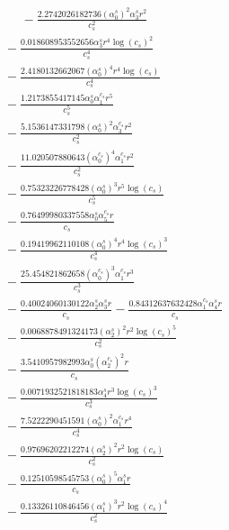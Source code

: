 \documentclass[10pt]{article}
\begin{document}
\begin{align*}
\phantom{R_{0,8}} &\phantom{={}}{}  - \frac{2.2742026182736 \left(\alpha_{0}^s\right)^{2} \alpha_{3}^s r^{2}}{c_{s}^{2}} \\
&{}  - \frac{0.018608953552656 \alpha_{3}^s r^{4} \log{\left(c_{s} \right)}^{2}}{c_{s}^{4}} \\
&{}  - \frac{2.4180132662067 \left(\alpha_{0}^s\right)^{4} r^{4} \log{\left(c_{s} \right)}}{c_{s}^{4}} \\
&{}  - \frac{1.2173855417145 \alpha_{0}^s \alpha_{1}^{c_s} r^{5}}{c_{s}^{5}} \\
&{}  - \frac{5.1536147331798 \left(\alpha_{0}^s\right)^{2} \alpha_{3}^{c_s} r^{2}}{c_{s}^{2}} \\
&{}  - \frac{11.020507880643 \left(\alpha_{0}^{c_s}\right)^{4} \alpha_{1}^{c_s} r^{2}}{c_{s}^{2}} \\
&{}  - \frac{0.75323226778428 \left(\alpha_{0}^s\right)^{3} r^{5} \log{\left(c_{s} \right)}}{c_{s}^{5}} \\
&{}  - \frac{0.76499980337558 \alpha_{0}^s \alpha_{5}^{c_s} r}{c_{s}} \\
&{}  - \frac{0.19419962110108 \left(\alpha_{0}^s\right)^{4} r^{4} \log{\left(c_{s} \right)}^{3}}{c_{s}^{4}} \\
&{}  - \frac{25.454821862658 \left(\alpha_{0}^{c_s}\right)^{3} \alpha_{1}^{c_s} r^{3}}{c_{s}^{3}} \\
&{}  - \frac{0.40024060130122 \alpha_{2}^s \alpha_{3}^s r}{c_{s}} - \frac{0.84312637632428 \alpha_{1}^{c_s} \alpha_{4}^s r}{c_{s}} \\
&{}  - \frac{0.0068878491324173 \left(\alpha_{2}^s\right)^{2} r^{2} \log{\left(c_{s} \right)}^{5}}{c_{s}^{2}} \\
&{}  - \frac{3.5410957982993 \alpha_{0}^s \left(\alpha_{2}^{c_s}\right)^{2} r}{c_{s}} \\
&{}  - \frac{0.0071932521818183 \alpha_{4}^s r^{3} \log{\left(c_{s} \right)}^{3}}{c_{s}^{3}} \\
&{}  - \frac{7.5222290451591 \left(\alpha_{0}^s\right)^{2} \alpha_{1}^{c_s} r^{4}}{c_{s}^{4}} \\
&{}  - \frac{0.97696202212274 \left(\alpha_{2}^s\right)^{2} r^{2} \log{\left(c_{s} \right)}}{c_{s}^{2}} \\
&{}  - \frac{0.12510598545753 \left(\alpha_{0}^s\right)^{5} \alpha_{1}^s r}{c_{s}} \\
&{}  - \frac{0.13326110846456 \left(\alpha_{1}^s\right)^{3} r^{2} \log{\left(c_{s} \right)}^{4}}{c_{s}^{2}} \\

\end{align*}
\end{document}
